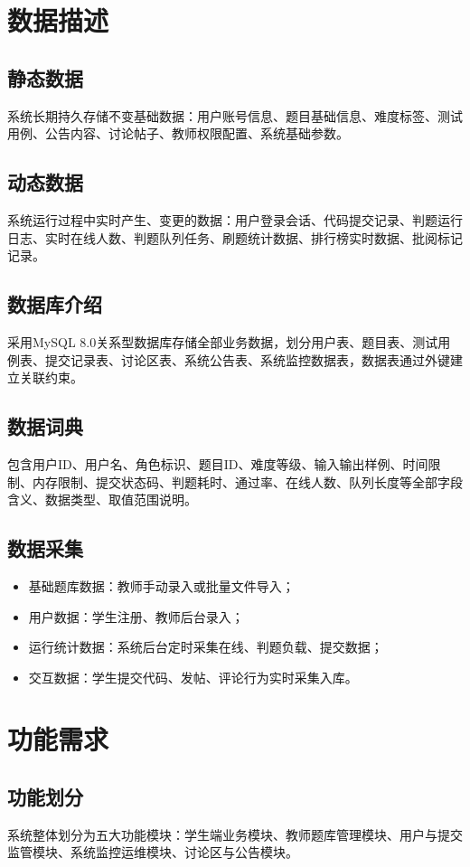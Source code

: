 \documentclass{../template/softeng}
\begin{document}
\section{数据描述}
\subsection{静态数据}
系统长期持久存储不变基础数据：用户账号信息、题目基础信息、难度标签、测试用例、公告内容、讨论帖子、教师权限配置、系统基础参数。

\subsection{动态数据}
系统运行过程中实时产生、变更的数据：用户登录会话、代码提交记录、判题运行日志、实时在线人数、判题队列任务、刷题统计数据、排行榜实时数据、批阅标记记录。

\subsection{数据库介绍}
采用MySQL 8.0关系型数据库存储全部业务数据，划分用户表、题目表、测试用例表、提交记录表、讨论区表、系统公告表、系统监控数据表，数据表通过外键建立关联约束。

\subsection{数据词典}
包含用户ID、用户名、角色标识、题目ID、难度等级、输入输出样例、时间限制、内存限制、提交状态码、判题耗时、通过率、在线人数、队列长度等全部字段含义、数据类型、取值范围说明。

\subsection{数据采集}
\begin{itemize}
    \item 基础题库数据：教师手动录入或批量文件导入；
    \item 用户数据：学生注册、教师后台录入；
    \item 运行统计数据：系统后台定时采集在线、判题负载、提交数据；
    \item 交互数据：学生提交代码、发帖、评论行为实时采集入库。
\end{itemize}

\section{功能需求}
\subsection{功能划分}
系统整体划分为五大功能模块：学生端业务模块、教师题库管理模块、用户与提交监管模块、系统监控运维模块、讨论区与公告模块。
\end{document}
